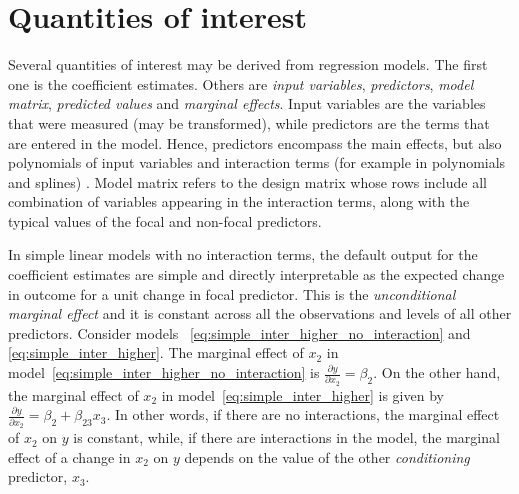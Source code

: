 \documentclass[10pt,letterpaper]{article}
\begin{document}
\section*{Quantities of interest}

Several quantities of interest may be derived from regression models. The first one is the coefficient estimates. Others are \emph{input variables},  \emph{predictors}, \emph{model matrix}, \emph{predicted values} and \emph{marginal effects}. Input variables are the variables that were measured (may be transformed), while predictors are the terms that are entered in the model. Hence, predictors encompass the main effects, but also polynomials of input variables and interaction terms (for example in polynomials and splines) \cite{schielzeth2010simple}. Model matrix refers to the design matrix whose rows include all combination of variables appearing in the interaction terms, along with the typical values of the focal and non-focal predictors.

In simple linear models with no interaction terms, the default output for the coefficient estimates are simple and directly interpretable as the expected change in outcome for a unit change in focal predictor. This is the \emph{unconditional marginal effect} \cite{leeper2017interpreting} and it is constant across all the observations and levels of all other predictors. Consider models ~\ref{eq:simple_inter_higher_no_interaction} and \ref{eq:simple_inter_higher}. The marginal effect of $x_2$ in model~\ref{eq:simple_inter_higher_no_interaction} is $\frac{\partial y}{\partial x_2} = \beta_2$. On the other hand, the marginal effect of $x_2$ in model~\ref{eq:simple_inter_higher} is given by $\frac{\partial y}{\partial x_2} = \beta_2 + \beta_{23}x_3$. In other words, if there are no interactions, the marginal effect of $x_2$ on $y$ is constant, while, if there are interactions in the model, the marginal effect of a change in $x_2$ on $y$ depends on the value of the other \emph{conditioning} predictor, $x_3$. 

\end{document}
